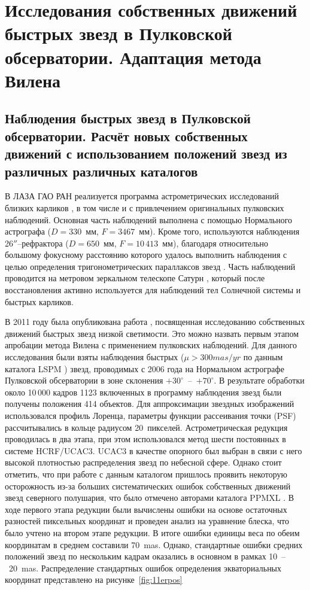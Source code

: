 \chapter{Исследования собственных движений быстрых звезд в Пулковcкой обсерватории. Адаптация метода Вилена} \label{ch:ch3}
\section{Наблюдения быстрых звезд в Пулковской обсерватории. Расчёт новых собственных движений с использованием положений звезд из различных различных каталогов} \label{sec:ch3/sect1}
В ЛАЗА ГАО РАН  реализуется программа астрометрических исследований близких карликов , в том числе и с привлечением оригинальных пулковских наблюдений. Основная часть наблюдений выполнена с помощью Нормального астрографа ($D=330$~мм, $F=3467$~мм).  Кроме того, используются наблюдения  26$''$--рефрактора ($D=650$~мм, $F=10\,413$~мм), благодаря относительно большому фокусному расстоянию которого удалось выполнить наблюдения с целью определения тригонометрических параллаксов звезд . Часть наблюдений проводится на метровом зеркальном телескопе Сатурн , который после восстановления активно используется для наблюдений тел Солнечной системы и быстрых карликов.

В 2011 году была опубликована работа , посвященная исследованию собственных движений быстрых звезд низкой светимости. Это можно назвать первым этапом апробации метода Вилена с применением пулковских наблюдений. Для данного исследования были взяты наблюдения быстрых ($\mu>300 mas/yr$ по данным каталога LSPM ) звезд, проводимых с 2006 года на Нормальном астрографе Пулковской обсерватории в зоне склонения $+30^{\circ}$~--~$+70^{\circ}$. В результате обработки около 10\,000 кадров 1123 включенных в программу наблюдения звезд были получены положения 414 объектов. Для аппроксимации звездных изображений использовался профиль Лоренца, параметры функции рассеивания точки (PSF) рассчитывались в кольце радиусом 20~пикселей. Астрометрическая редукция проводилась в два этапа, при этом использовался метод шести постоянных в системе  HCRF/UCAC3. UCAC3  в качестве опорного был выбран в связи с него высокой плотностью распределения звезд по небесной сфере. Однако стоит отметить, что при работе с данным каталогом пришлось проявить некоторую осторожность из-за больших систематических ошибок собственных движений звезд северного полушария, что было отмечено авторами  каталога PPMXL . В ходе первого этапа редукции были вычислены ошибки на основе остаточных разностей пиксельных координат и проведен анализ на уравнение блеска, что было учтено на втором этапе редукции. В итоге ошибки единицы веса по обеим координатам в среднем составили 70~mas. Однако, стандартные ошибки средних положений звезд по нескольким кадрам оказались в основном в рамках 10~--~20~mas. Распределение стандартных ошибок определения экваториальных координат представлено на рисунке~\ref{fig:11erpos}

